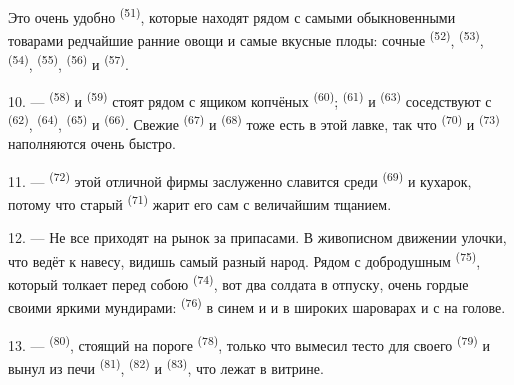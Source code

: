 Это очень удобно  \textsuperscript{(51)}, которые находят
рядом с самыми обыкновенными товарами редчайшие ранние овощи и самые
вкусные плоды: сочные  \textsuperscript{(52)}, 
\textsuperscript{(53)},  \textsuperscript{(54)}, 
\textsuperscript{(55)},  \textsuperscript{(56)} и 
\textsuperscript{(57)}.

\VUsaut{4.0mm}
\VUsaut{3.0mm}

10. ---  \textsuperscript{(58)} и  \textsuperscript{(59)}
стоят рядом с ящиком копчёных  \textsuperscript{(60)};
 \textsuperscript{(61)} и  \textsuperscript{(63)}
соседствуют с  \textsuperscript{(62)}, 
\textsuperscript{(64)},  \textsuperscript{(65)} и
 \textsuperscript{(66)}. Свежие  \textsuperscript{(67)} и
 \textsuperscript{(68)} тоже есть в этой лавке, так что
 \textsuperscript{(70)} и  \textsuperscript{(73)}
наполняются очень быстро.

11. ---  \textsuperscript{(72)} этой отличной фирмы заслуженно
славится среди  \textsuperscript{(69)} и кухарок, потому что
старый  \textsuperscript{(71)} жарит его сам с величайшим
тщанием.

\VUsaut{4.0mm}
\VUsaut{3.0mm}

12. --- Не все приходят на рынок за припасами. В живописном движении
улочки, что ведёт к навесу, видишь самый разный народ. Рядом с добродушным
 \textsuperscript{(75)}, который толкает перед собою
 \textsuperscript{(74)}, вот два солдата в отпуску, очень гордые
своими яркими мундирами:  \textsuperscript{(76)} в синем
 и  и  в
широких шароварах и с  на голове.

13. ---  \textsuperscript{(80)}, стоящий на пороге
 \textsuperscript{(78)}, только что вымесил тесто для своего
 \textsuperscript{(79)} и вынул из печи 
\textsuperscript{(81)},  \textsuperscript{(82)} и 
\textsuperscript{(83)}, что лежат в витрине.

